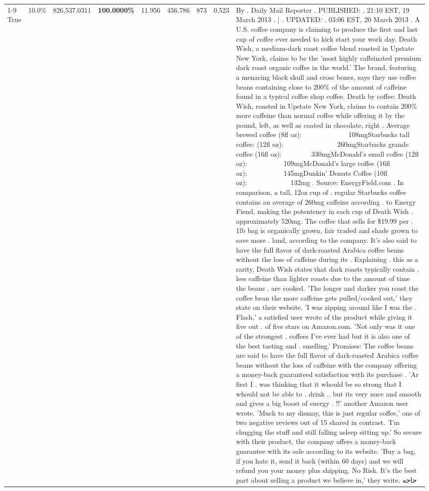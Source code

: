 \begin{table}[H]
{\begin{tabular}{lllrlllll}
\cline{1-9}
True & 10.0\% & 826,537.0311 & \bfseries \color{red} 100.0000\% & 11.956 & 456.786 & 873 & 0.523 & By . Daily Mail Reporter . PUBLISHED: . 21:10 EST, 19 March 2013 . | . UPDATED: . 03:06 EST, 20 March 2013 . A U.S. coffee company is claiming to produce the first and last cup of coffee ever needed to kick start your work day. Death Wish, a medium-dark roast coffee blend roasted in Upstate New York, claims to be the 'most highly caffeinated premium dark roast organic coffee in the world.' The brand, featuring a menacing black skull and cross bones, says they use coffee beans containing close to 200\% of the amount of caffeine found in a typical coffee shop coffee. Death by coffee: Death Wish, roasted in Upstate New York, claims to contain 200\% more caffeine than normal coffee while offering it by the pound, left, as well as coated in chocolate, right . Average brewed coffee (8fl oz):              108mgStarbucks tall coffee: (12fl oz):                260mgStarbucks grande coffee (16fl oz):         330mgMcDonald's small coffee (12fl oz):           109mgMcDonald's large coffee (16fl oz):           145mgDunkin' Donuts Coffee (10fl oz):             132mg . Source: EnergyField.com . In comparison, a tall, 12oz cup of . regular Starbucks coffee contains an average of 260mg caffeine according . to Energy Fiend, making the potentency in each cup of Death Wish . approximately 520mg. The coffee that sells for \$19.99 per . 1lb bag is organically grown, fair traded and shade grown to save more . land, according to the company. It's also said to have the full flavor of dark-roasted Arabica coffee beans without the loss of caffeine during its . Explaining . this as a rarity, Death Wish states that dark roasts typically contain . less caffeine than lighter roasts due to the amount of time the beans . are cooked. 'The longer and darker you roast the coffee bean the more caffeine gets pulled/cooked out,' they state on their website. 'I was zipping around like I was the . Flash,' a satisfied user wrote of the product while giving it five out . of five stars on Amazon.com. 'Not only was it one of the strongest . coffees I've ever had but it is also one of the best tasting and . smelling.’ Promises: The coffee beans are said to have the full flavor of dark-roasted Arabica coffee beans without the loss of caffeine with the company offering a money-back guaranteed satisfaction with its purchase . 'Ar first I . was thinking that it whould be so strong that I whould not be able to . drink .. but its very nuce and smooth and gives a big boost of energy . !!' another Amazon user wrote. 'Much to my dismay, this is just regular coffee,' one of two negative reviews out of 15 shared in contrast. 'I'm chugging the stuff and still falling asleep sitting up.' So secure with their product, the company offers a money-back guarantee with its sale according to its website. 'Buy a bag, if you hate it, send it back (within 60 days) and we will refund you your money plus shipping. No Risk. It’s the best part about selling a product we believe in,' they write. حاجه \\

\end{tabular}}
\end{table}
